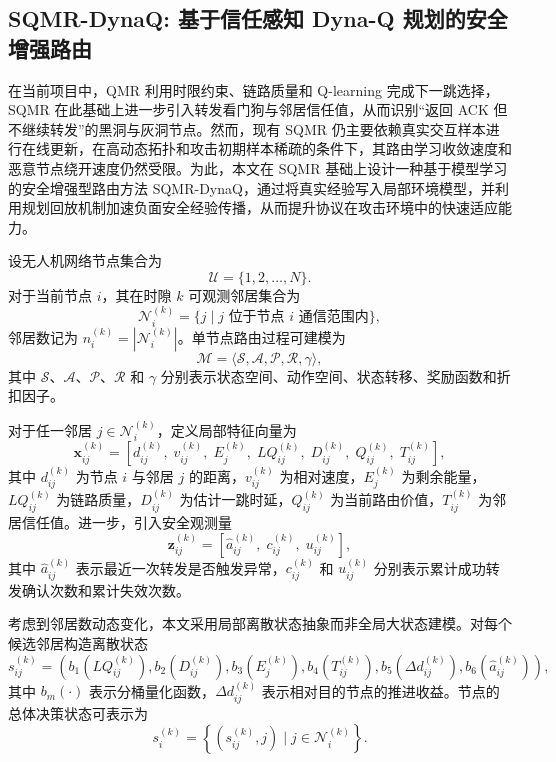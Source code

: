 \subsection{SQMR-DynaQ: 基于信任感知 Dyna-Q 规划的安全增强路由}

在当前项目中，QMR 利用时限约束、链路质量和 Q-learning 完成下一跳选择，SQMR 在此基础上进一步引入转发看门狗与邻居信任值，从而识别“返回 ACK 但不继续转发”的黑洞与灰洞节点。然而，现有 SQMR 仍主要依赖真实交互样本进行在线更新，在高动态拓扑和攻击初期样本稀疏的条件下，其路由学习收敛速度和恶意节点绕开速度仍然受限。为此，本文在 SQMR 基础上设计一种基于模型学习的安全增强型路由方法 SQMR-DynaQ，通过将真实经验写入局部环境模型，并利用规划回放机制加速负面安全经验传播，从而提升协议在攻击环境中的快速适应能力。

设无人机网络节点集合为
\begin{equation}
\mathcal{U}=\{1,2,\dots,N\}.
\end{equation}
对于当前节点 $i$，其在时隙 $k$ 可观测邻居集合为
\begin{equation}
\mathcal{N}_i^{(k)}=\{j \mid j \text{ 位于节点 } i \text{ 通信范围内}\},
\end{equation}
邻居数记为 $n_i^{(k)}=|\mathcal{N}_i^{(k)}|$。单节点路由过程可建模为
\begin{equation}
\mathcal{M}=\langle \mathcal{S},\mathcal{A},\mathcal{P},\mathcal{R},\gamma \rangle,
\end{equation}
其中 $\mathcal{S}$、$\mathcal{A}$、$\mathcal{P}$、$\mathcal{R}$ 和 $\gamma$ 分别表示状态空间、动作空间、状态转移、奖励函数和折扣因子。

对于任一邻居 $j \in \mathcal{N}_i^{(k)}$，定义局部特征向量为
\begin{equation}
\mathbf{x}_{ij}^{(k)}=
\left[
d_{ij}^{(k)},\;
v_{ij}^{(k)},\;
E_j^{(k)},\;
LQ_{ij}^{(k)},\;
D_{ij}^{(k)},\;
Q_{ij}^{(k)},\;
T_{ij}^{(k)}
\right],
\end{equation}
其中 $d_{ij}^{(k)}$ 为节点 $i$ 与邻居 $j$ 的距离，$v_{ij}^{(k)}$ 为相对速度，$E_j^{(k)}$ 为剩余能量，$LQ_{ij}^{(k)}$ 为链路质量，$D_{ij}^{(k)}$ 为估计一跳时延，$Q_{ij}^{(k)}$ 为当前路由价值，$T_{ij}^{(k)}$ 为邻居信任值。进一步，引入安全观测量
\begin{equation}
\mathbf{z}_{ij}^{(k)}=
\left[
\hat a_{ij}^{(k)},\;
c_{ij}^{(k)},\;
u_{ij}^{(k)}
\right],
\end{equation}
其中 $\hat a_{ij}^{(k)}$ 表示最近一次转发是否触发异常，$c_{ij}^{(k)}$ 和 $u_{ij}^{(k)}$ 分别表示累计成功转发确认次数和累计失效次数。

考虑到邻居数动态变化，本文采用局部离散状态抽象而非全局大状态建模。对每个候选邻居构造离散状态
\begin{equation}
s_{ij}^{(k)}=
\left(
b_1(LQ_{ij}^{(k)}),
b_2(D_{ij}^{(k)}),
b_3(E_j^{(k)}),
b_4(T_{ij}^{(k)}),
b_5(\Delta d_{ij}^{(k)}),
b_6(\hat a_{ij}^{(k)})
\right),
\end{equation}
其中 $b_m(\cdot)$ 表示分桶量化函数，$\Delta d_{ij}^{(k)}$ 表示相对目的节点的推进收益。节点的总体决策状态可表示为
\begin{equation}
s_i^{(k)}=\left\{\left(s_{ij}^{(k)},j\right)\mid j\in\mathcal{N}_i^{(k)}\right\}.
\end{equation}

